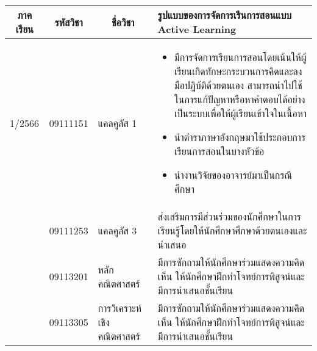 {\small
	\begin{center}
		\begin{longtable}{|p{}|p{}|p{}|p{}|}
			\hline
			\multicolumn{1}{|c|}{\textbf{ภาคเรียน}} &
			\multicolumn{1}{c|}{\textbf{รหัสวิชา}} &
			\multicolumn{1}{c|}{\textbf{ชื่อวิชา}} &
			\textbf{รูปแบบของการจัดการเรีนการสอนแบบ Active Learning}\\
			\hline
			\endhead	
	
	1/2566&
	09111151&
	แคลคูลัส 1&
	\begin{itemize}
		\item มีการจัดการเรียนการสอนโดยเน้นให้ผู้เรียนเกิดทักษะกระบวนการคิดและลงมือปฏิบ้ติด้วยตนเอง สามารถนำไปใช้ในการแก้ปัญหาหรือหาคำตอบได้อย่างเป็นระบบเพื่อให้ผู้เรียนเข้าใจในเนื้อหา
		\item นำตำราภาษาอังกฤษมาใช้ประกอบการเรียนการสอนในบางหัวข้อ
		\item นำงานวิจัยของอาจารย์มาเป็นกรณีศึกษา
	\end{itemize}
 	 
	\\ \cline{2-4}
	
	&09111253 &
	แคลคูลัส 3 &
	ส่งเสริมการมีส่วนร่วมของนักศึกษาในการเรียนรู้โดยให้นักศึกษาศึกษาด้วยตนเองและนำเสนอ\\ \cline{2-4}
	
	&09113201&
	หลักคณิตศาสตร์&
	 มีการซักถามให้นักศึกษาร่วมแสดงความคิดเห็น  ให้นักศึกษาฝึกทำโจทย์การพิสูจน์และมีการนำเสนอชั้นเรียน\\ \cline{2-4}
		
	& 09113305
	& การวิเคราะห์เชิงคณิตศาสตร์ &มีการซักถามให้นักศึกษาร่วมแสดงความคิดเห็น  ให้นักศึกษาฝึกทำโจทย์การพิสูจน์และมีการนำเสนอชั้นเรียน
	\\ \cline{2-4}
	

\end{longtable}
\end{center}}
